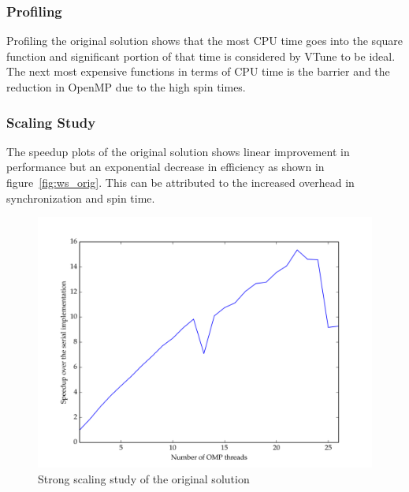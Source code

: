 \documentclass[11pt]{article}
\begin{document}
\subsubsection{Profiling} \label{sec:prof_orig}

Profiling the original solution shows that the most CPU time goes into the square function and significant portion of that time is considered by VTune to be ideal. The next most expensive functions in terms of CPU time is the barrier and the reduction in OpenMP due to the high spin times. 



\subsubsection{Scaling Study} \label{sec:speedup_orig}

The speedup plots of the original solution shows linear improvement in performance but an exponential decrease in efficiency as shown in figure~\ref{fig:ws_orig}. This can be attributed to the increased overhead in synchronization and spin time.

\begin{figure}[H]
\centering
\includegraphics[scale=0.5]{./scaling_studies/strong_scaling_original.png}
\caption{Strong scaling study of the original solution}
\label{fig:ss_orig}
\end{figure}
\end{document}
